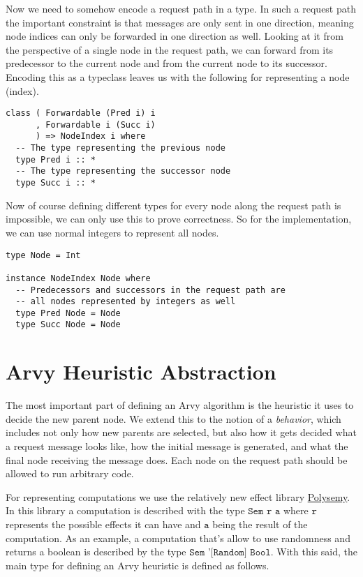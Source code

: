 \documentclass[a4paper, oneside]{discothesis}
\begin{document}
Now we need to somehow encode a request path in a type. In such a request path the important constraint is that messages are only sent in one direction, meaning node indices can only be forwarded in one direction as well. Looking at it from the perspective of a single node in the request path, we can forward from its predecessor to the current node and from the current node to its successor. Encoding this as a typeclass leaves us with the following for representing a node (index).

\begin{verbatim}
class ( Forwardable (Pred i) i
      , Forwardable i (Succ i)
      ) => NodeIndex i where
  -- The type representing the previous node
  type Pred i :: *
  -- The type representing the successor node
  type Succ i :: *
\end{verbatim}

Now of course defining different types for every node along the request path is impossible, we can only use this to prove correctness. So for the implementation, we can use normal integers to represent all nodes.

\begin{verbatim}
type Node = Int

instance NodeIndex Node where
  -- Predecessors and successors in the request path are
  -- all nodes represented by integers as well
  type Pred Node = Node
  type Succ Node = Node
\end{verbatim}

\section{Arvy Heuristic Abstraction}

The most important part of defining an Arvy algorithm is the heuristic it uses to decide the new parent node. We extend this to the notion of a \textit{behavior}, which includes not only how new parents are selected, but also how it gets decided what a request message looks like, how the initial message is generated, and what the final node receiving the message does. Each node on the request path should be allowed to run arbitrary code.

For representing computations we use the relatively new effect library \href{https://hackage.haskell.org/package/polysemy}{Polysemy}. In this library a computation is described with the type $\texttt{Sem r a}$ where $\texttt{r}$ represents the possible effects it can have and $\texttt{a}$ being the result of the computation. As an example, a computation that's allow to use randomness and returns a boolean is described by the type $\texttt{Sem '[Random] Bool}$. With this said, the main type for defining an Arvy heuristic is defined as follows.
\end{document}
